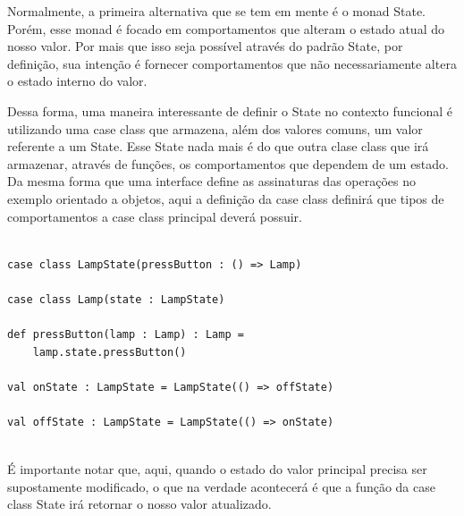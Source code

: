 Normalmente, a primeira alternativa que se tem em mente é 
o monad State. Porém, esse monad é focado em comportamentos 
que alteram o estado atual do nosso valor. Por mais que isso 
seja possível através do padrão State, por definição, sua 
intenção é fornecer comportamentos que não necessariamente 
altera o estado interno do valor.

Dessa forma, uma maneira interessante de definir o State 
no contexto funcional é utilizando uma case class que armazena, 
além dos valores comuns, um valor referente a um State. 
Esse State nada mais é do que outra clase class que 
irá armazenar, através de funções, os comportamentos que 
dependem de um estado. Da mesma forma que uma interface 
define as assinaturas das operações no exemplo orientado a 
objetos, aqui a definição da case class definirá que tipos 
de comportamentos a case class principal deverá possuir.

\begin{lstlisting}[caption={State Funcional},label=fpstate]
    
case class LampState(pressButton : () => Lamp)

case class Lamp(state : LampState)

def pressButton(lamp : Lamp) : Lamp =
    lamp.state.pressButton()

val onState : LampState = LampState(() => offState)

val offState : LampState = LampState(() => onState)
    
\end{lstlisting}

É importante notar que, aqui, quando o estado do valor 
principal precisa ser supostamente modificado, o que na 
verdade acontecerá é que a função da case class State 
irá retornar o nosso valor atualizado.